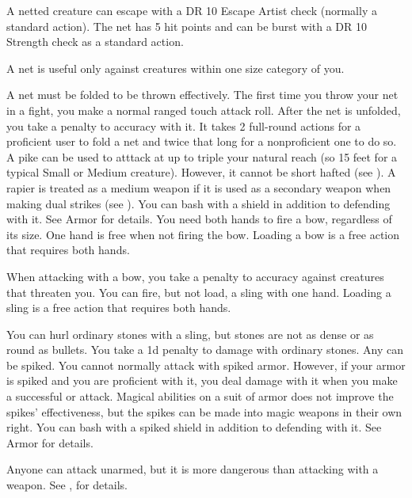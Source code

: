         \par A netted creature can escape with a DR 10 Escape Artist check (normally a standard action). The net has 5 hit points and can be burst with a DR 10 Strength check as a standard action.
        \par A net is useful only against creatures within one size category of you.
        \par A net must be folded to be thrown effectively. The first time you throw your net in a fight, you make a normal ranged touch attack roll. After the net is unfolded, you take a  penalty to accuracy with it. It takes 2 full-round actions for a proficient user to fold a net and twice that long for a nonproficient one to do so.
         A pike can be used to atttack at up to triple your natural reach (so 15 feet for a typical Small or Medium creature).
        However, it cannot be short hafted (see ).
         A rapier is treated as a medium weapon if it is used as a secondary weapon when making dual strikes (see ).
         You can bash with a shield in addition to defending with it. See Armor for details.
         You need both hands to fire a bow, regardless of its size. One hand is free when not firing the bow. Loading a bow is a free action that requires both hands.
        \par When attacking with a bow, you take a  penalty to accuracy against creatures that threaten you.
         You can fire, but not load, a sling with one hand. Loading a sling is a free action that requires both hands.
        \par You can hurl ordinary stones with a sling, but stones are not as dense or as round as bullets. You take a \minus1d penalty to damage with ordinary stones.
         Any  can be spiked.
        You cannot normally attack with spiked armor.
        However, if your armor is spiked and you are proficient with it, you deal damage with it when you make a successful  or  attack.
        Magical abilities on a suit of armor does not improve the spikes' effectiveness, but the spikes can be made into magic weapons in their own right.
         You can bash with a spiked shield in addition to defending with it. See Armor for details.

         Anyone can attack unarmed, but it is more dangerous than attacking with a weapon. See , for details.

